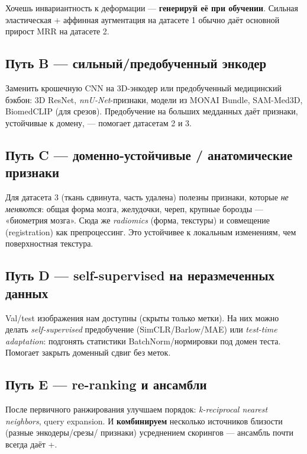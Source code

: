 \documentclass[11pt,a4paper]{article}
\begin{document}
\begin{compression}
Хочешь инвариантность к деформации — \textbf{генерируй её при обучении}. Сильная эластическая +
аффинная аугментация на датасете 1 обычно даёт основной прирост MRR на датасете 2.
\end{compression}

\subsection{Путь B — сильный/предобученный энкодер}

Заменить крошечную CNN на 3D-энкодер или предобученный медицинский бэкбон: 3D ResNet,
\emph{nnU-Net}-признаки, модели из MONAI Bundle, SAM-Med3D, BiomedCLIP (для срезов). Предобучение
на больших медданных даёт признаки, устойчивые к домену, — помогает датасетам 2 и 3.

\subsection{Путь C — доменно-устойчивые / анатомические признаки}

Для датасета 3 (ткань сдвинута, часть удалена) полезны признаки, которые \emph{не меняются}:
общая форма мозга, желудочки, череп, крупные борозды — «биометрия мозга». Сюда же
\emph{radiomics} (форма, текстуры) и совмещение (registration) как препроцессинг. Это устойчивее
к локальным изменениям, чем поверхностная текстура.

\subsection{Путь D — self-supervised на неразмеченных данных}

Val/test изображения нам доступны (скрыты только метки). На них можно делать
\emph{self-supervised} предобучение (SimCLR/Barlow/MAE) или \emph{test-time adaptation}: подгонять
статистики BatchNorm/нормировки под домен теста. Помогает закрыть доменный сдвиг без меток.

\subsection{Путь E — re-ranking и ансамбли}

После первичного ранжирования улучшаем порядок: \emph{k-reciprocal nearest neighbors},
query expansion. И \textbf{комбинируем} несколько источников близости (разные энкодеры/срезы/
признаки) усреднением скорингов — ансамбль почти всегда даёт +.
\end{document}

